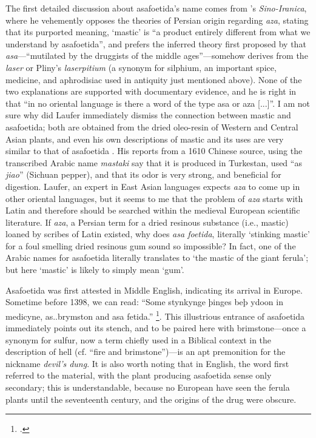 The first detailed discussion about asafoetida's name comes from \autocite[353-362]{laufer_sino-iranica_1919}'s \textit{Sino-Iranica}, where he vehemently opposes the theories of Persian origin regarding \textit{aza}, stating that its purported meaning, `mastic' is ``a product entirely different from what we understand by asafoetida'', and prefers the inferred theory first proposed by \textcite[41]{garcia_da_orta_colloquies_1913} that \textit{asa}---``mutilated by the druggists of the middle ages''---somehow derives from the \textit{laser} or Pliny's \textit{laserpitium} (a synonym for silphium, an important spice, medicine, and aphrodisiac used in antiquity just mentioned above). None of the two explanations are supported with documentary evidence, and he is right in that ``in no oriental language is there a word of the type asa or aza [...]''. I am not sure why did Laufer immediately dismiss the connection between mastic and asafoetida; both are obtained from the dried oleo-resin of Western and Central Asian plants, and even his own descriptions of mastic and its uses are very similar to that of asafoetida \autocite[252]{laufer_sino-iranica_1919}. His reports from a 1610 Chinese source, using the transcribed Arabic name \textit{mastaki} say that it is produced in Turkestan, used ``as \textit{jiao}'' (Sichuan pepper), and that its odor is very strong, and beneficial for digestion. Laufer, an expert in East Asian languages expects \textit{aza} to come up in other oriental languages, but it seems to me that the problem of \textit{aza} starts with Latin and therefore should be searched within the medieval European scientific literature. If \textit{aza}, a Persian term for a dried resinous substance (i.e., mastic) loaned by scribes of Latin existed, why does \textit{asa foetida}, literally `stinking mastic' for a foul smelling dried resinous gum sound so impossible? In fact, one of the Arabic names for asafoetida literally translates to `the mastic of the giant ferula'; but here `mastic' is likely to simply mean `gum'.

Asafoetida was first attested in Middle English, indicating its arrival in Europe. Sometime before 1398, we can read: ``Some stynkynge þinges beþ ydoon in medicyne, as..brymston and asa fetida.'' \footcite[asafoetida]{oed}. This illustrious entrance of asafoetida immediately points out its stench, and to be paired here with brimstone---once a synonym for sulfur, now a term chiefly used in a Biblical context in the description of hell (cf. ``fire and brimstone'')---is an apt premonition for the nickname \textit{devil's dung}. It is also worth noting that in English, the word first referred to the material, with the plant producing asafoetida sense only secondary; this is understandable, because no European have seen the ferula plants until the seventeenth century, and the origins of the drug were obscure.

